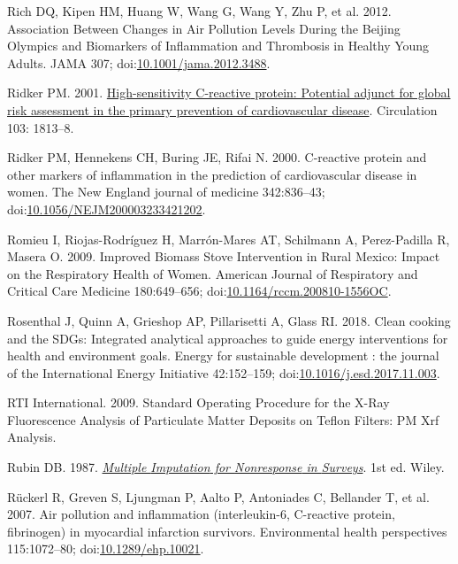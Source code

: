 \documentclass[
  letterpaper,
  DIV=11,
  numbers=noendperiod]{scrartcl}
\newlength{\cslhangindent}
\newlength{\cslentryspacingunit} %
\newenvironment{CSLReferences}[2] %
 {%
  \setlength{\parindent}{0pt}
  \ifodd #1
  \let\oldpar\par
  \def\par{\hangindent=\cslhangindent\oldpar}
  \fi
  \setlength{\parskip}{#2\cslentryspacingunit}
 }%
 {}
\begin{document}
\begin{CSLReferences}{1}{0}
\leavevmode{}%
Rich DQ, Kipen HM, Huang W, Wang G, Wang Y, Zhu P, et al. 2012.
Association {Between Changes} in {Air Pollution Levels During} the
{Beijing Olympics} and {Biomarkers} of {Inflammation} and {Thrombosis}
in {Healthy Young Adults}. JAMA 307;
doi:\href{https://doi.org/10.1001/jama.2012.3488}{10.1001/jama.2012.3488}.

\leavevmode{}%
Ridker PM. 2001.
\href{https://www.ncbi.nlm.nih.gov/pubmed/11282915}{High-sensitivity
{C-reactive} protein: Potential adjunct for global risk assessment in
the primary prevention of cardiovascular disease}. Circulation 103:
1813--8.

\leavevmode{}%
Ridker PM, Hennekens CH, Buring JE, Rifai N. 2000. C-reactive protein
and other markers of inflammation in the prediction of cardiovascular
disease in women. The New England journal of medicine 342:836--43;
doi:\href{https://doi.org/10.1056/NEJM200003233421202}{10.1056/NEJM200003233421202}.

\leavevmode{}%
Romieu I, Riojas-Rodríguez H, Marrón-Mares AT, Schilmann A,
Perez-Padilla R, Masera O. 2009. Improved {Biomass Stove Intervention}
in {Rural Mexico}: {Impact} on the {Respiratory Health} of {Women}.
American Journal of Respiratory and Critical Care Medicine 180:649--656;
doi:\href{https://doi.org/10.1164/rccm.200810-1556OC}{10.1164/rccm.200810-1556OC}.

\leavevmode{}%
Rosenthal J, Quinn A, Grieshop AP, Pillarisetti A, Glass RI. 2018. Clean
cooking and the {SDGs}: {Integrated} analytical approaches to guide
energy interventions for health and environment goals. Energy for
sustainable development : the journal of the International Energy
Initiative 42:152--159;
doi:\href{https://doi.org/10.1016/j.esd.2017.11.003}{10.1016/j.esd.2017.11.003}.

\leavevmode{}%
RTI International. 2009. Standard {Operating Procedure} for the {X-Ray
Fluorescence Analysis} of {Particulate Matter Deposits} on {Teflon
Filters}: {PM Xrf Analysis}.

\leavevmode{}%
Rubin DB. 1987.
\emph{\href{https://doi.org/10.1002/9780470316696}{Multiple {Imputation}
for {Nonresponse} in {Surveys}}}. 1st ed. Wiley.

\leavevmode{}%
Rückerl R, Greven S, Ljungman P, Aalto P, Antoniades C, Bellander T, et
al. 2007. Air pollution and inflammation (interleukin-6, {C-reactive}
protein, fibrinogen) in myocardial infarction survivors. Environmental
health perspectives 115:1072--80;
doi:\href{https://doi.org/10.1289/ehp.10021}{10.1289/ehp.10021}.


\end{CSLReferences}
\end{document}
